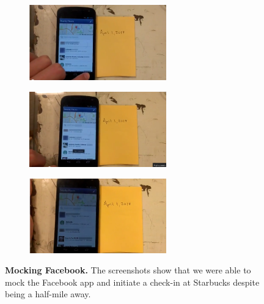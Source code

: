 \begin{figure}[t]

\begin{subfigure}[t]{2.33in}
\includegraphics[width=2.33in]{./figures/apps/facebook/facebook1.png}
\caption{}
\end{subfigure}%
\begin{subfigure}[t]{2.33in}
\includegraphics[width=2.33in]{./figures/apps/facebook/facebook2.png}
\caption{}
\end{subfigure}%
\begin{subfigure}[t]{2.33in}
\includegraphics[width=2.33in]{./figures/apps/facebook/facebook3.png}
\caption{}
\end{subfigure}

\caption{\textbf{Mocking Facebook.} The screenshots show that we were able to
mock the Facebook app and initiate a check-in at Starbucks despite being a
half-mile away.}

\label{fig-mocking-facebook}

\end{figure}

